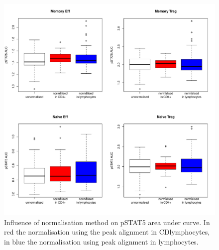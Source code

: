 \begin{figure}[h]
    \centering
    \includegraphics[scale=.5]{IL2/figures/pstat5-auc-boxplots-celltypes.pdf}
    { Influence of normalisation method on pSTAT5 area under curve. }
    { In red the normalisation using the peak alignment in CD\positive lymphocytes, in blue the normalisation using peak alignment in lymphocytes. }
\end{figure}


